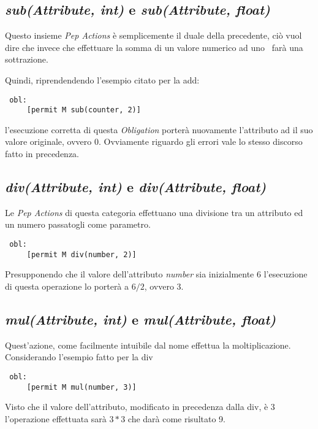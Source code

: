 \subsection*{\textit{sub(Attribute, int)} e \textit{sub(Attribute, float)}} %
\label{ssub:opsub}
Questo insieme \textit{Pep Actions} è semplicemente il duale della precedente, ciò vuol dire che invece che effettuare la somma di un valore numerico ad uno \statusattribute \ farà una sottrazione.\\ \par
Quindi, riprendendendo l'esempio citato per la add:
\begin{verbatim}
 obl:
     [permit M sub(counter, 2)]
\end{verbatim}
l'esecuzione corretta di questa \textit{Obligation} porterà nuovamente l'attributo ad il suo valore originale, ovvero 0. Ovviamente riguardo gli errori vale lo stesso discorso fatto in precedenza.

\subsection*{\textit{div(Attribute, int)} e \textit{div(Attribute, float)}} %
\label{ssub:opdiv}
Le \textit{Pep Actions} di questa categoria effettuano una divisione tra un attributo ed un numero passatogli come parametro.
\begin{verbatim}
 obl:
     [permit M div(number, 2)]
\end{verbatim}
Presupponendo che il valore dell'attributo \textit{number} sia inizialmente 6 l'esecuzione di questa operazione lo porterà a $6/2$, ovvero 3.

\subsection*{\textit{mul(Attribute, int)} e \textit{mul(Attribute, float)}} %
\label{ssub:opdiv}
Quest'azione, come facilmente intuibile dal nome effettua la moltiplicazione.
Considerando l'esempio fatto per la div
\begin{verbatim}
 obl:
     [permit M mul(number, 3)]
\end{verbatim}
Visto che il valore dell'attributo, modificato in precedenza dalla div, è 3 l'operazione effettuata sarà $3*3$ che darà come risultato 9.



